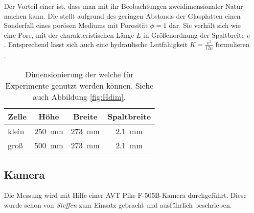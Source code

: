 Der Vorteil einer \HSC ist, dass man mit ihr Beobachtungen zweidimensionaler Natur machen kann.
Die \HSC stellt aufgrund des geringen Abstands der Glasplatten einen Sonderfall eines porösen Mediums mit Porosität $\phi = 1$ dar. Sie verhält sich wie eine Pore, mit der charakteristischen Länge $L$ in Größenordnung der Spaltbreite $e$. Entsprechend lässt sich auch eine hydraulische Leitfähigkeit $K = \frac{e^2}{12\mu}$ formulieren \citep{fernandez}. 


\begin{table}[b]
  \begin{tabularx}{\linewidth}{X|c|c|c} %
    Zelle			& Höhe				& Breite			& Spaltbreite \\
    \hline\hline
    klein 			& \SI{ 250}{\milli\meter}	& \SI{273}{\milli\meter}	& \SI[round-precision=1]{2,1}{\milli\meter} \\
    groß			& \SI{ 500}{\milli\meter}	& \SI{273}{\milli\meter}	& \SI[round-precision=1]{2,1}{\milli\meter}
  \end{tabularx}
  \caption{Dimensionierung der \HSCs welche für Experimente genutzt werden können. Siehe auch Abbildung \ref{fig:Hdim}.}
  \label{tab:Hdim}
\end{table}

\subsection{Kamera}
\label{sec:cam}
Die Messung wird mit Hilfe einer AVT Pike F-505B-Kamera durchgeführt. Diese wurde schon von \textit{Steffen} \cite{heberle} zum Einsatz gebracht und ausführlich
beschrieben. 

